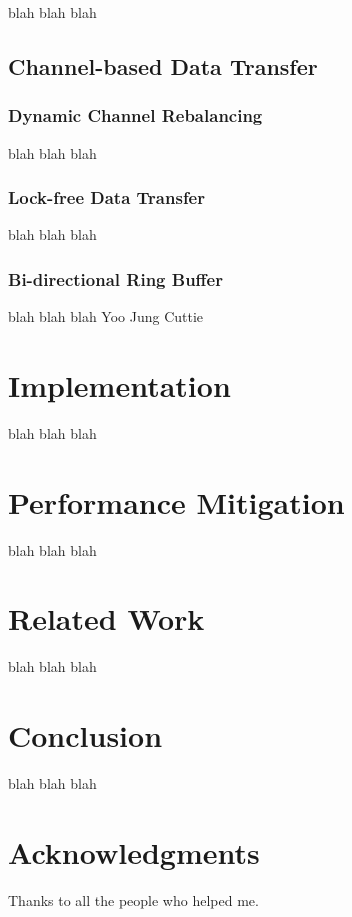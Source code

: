 \documentclass[letterpaper,twocolumn,10pt]{article}
\begin{document}
blah blah blah


\subsection{Channel-based Data Transfer}

\subsubsection{Dynamic Channel Rebalancing}

blah blah blah

\subsubsection{Lock-free Data Transfer}

blah blah blah

\subsubsection{Bi-directional Ring Buffer}

blah blah blah
Yoo Jung Cuttie


\section{Implementation}

blah blah blah


\section{Performance Mitigation}

blah blah blah

\section{Related Work}

blah blah blah

\section{Conclusion}

blah blah blah

\section*{Acknowledgments}

Thanks to all the people who helped me.
\end{document}
